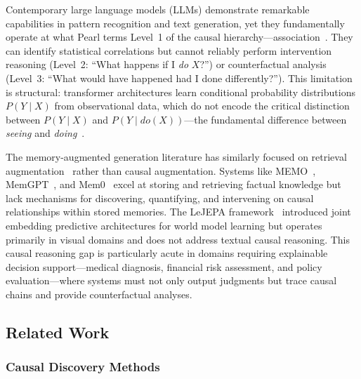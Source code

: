 \documentclass[11pt,a4paper]{article}
\begin{document}
Contemporary large language models (LLMs) demonstrate remarkable capabilities in pattern recognition and text generation, yet they fundamentally operate at what Pearl terms Level~1 of the causal hierarchy---association~\cite{pearl2009}. They can identify statistical correlations but cannot reliably perform intervention reasoning (Level~2: ``What happens if I \textit{do} \(X\)?'') or counterfactual analysis (Level~3: ``What would have happened had I done differently?''). This limitation is structural: transformer architectures learn conditional probability distributions \(P(Y \mid X)\) from observational data, which do not encode the critical distinction between \(P(Y \mid X)\) and \(P(Y \mid do(X))\)---the fundamental difference between \textit{seeing} and \textit{doing}~\cite{pearl2018}.

The memory-augmented generation literature has similarly focused on retrieval augmentation~\cite{lewis2020,guu2020,borgeaud2022} rather than causal augmentation. Systems like MEMO~\cite{memo2025}, MemGPT~\cite{packer2023}, and Mem0~\cite{mem0} excel at storing and retrieving factual knowledge but lack mechanisms for discovering, quantifying, and intervening on causal relationships within stored memories. The LeJEPA framework~\cite{lejepa2025} introduced joint embedding predictive architectures for world model learning but operates primarily in visual domains and does not address textual causal reasoning. This causal reasoning gap is particularly acute in domains requiring explainable decision support---medical diagnosis, financial risk assessment, and policy evaluation---where systems must not only output judgments but trace causal chains and provide counterfactual analyses.

\subsection{Related Work}

\subsubsection{Causal Discovery Methods}
\end{document}
